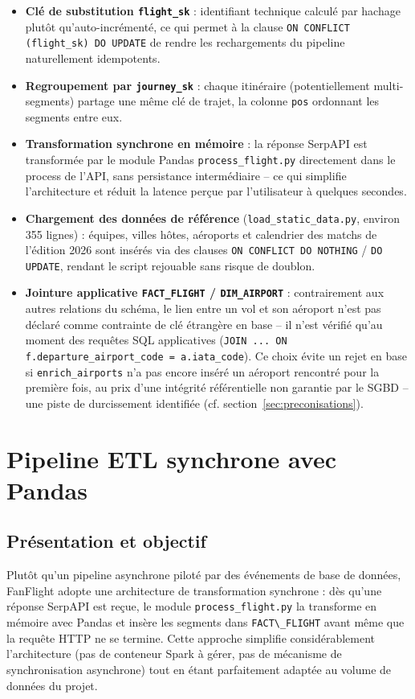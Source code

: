 \documentclass[11pt,a4paper]{report}
\newcommand{\code}[1]{\lstinline{#1}}
\begin{document}
\begin{itemize}
  \item \textbf{Clé de substitution \code{flight_sk}} : identifiant technique calculé par hachage plutôt qu'auto-incrémenté, ce qui permet à la clause \code{ON CONFLICT (flight_sk) DO UPDATE} de rendre les rechargements du pipeline naturellement idempotents.
  \item \textbf{Regroupement par \code{journey_sk}} : chaque itinéraire (potentiellement multi-segments) partage une même clé de trajet, la colonne \code{pos} ordonnant les segments entre eux.
  \item \textbf{Transformation synchrone en mémoire} : la réponse SerpAPI est transformée par le module Pandas \code{process_flight.py} directement dans le process de l'API, sans persistance intermédiaire -- ce qui simplifie l'architecture et réduit la latence perçue par l'utilisateur à quelques secondes.
  \item \textbf{Chargement des données de référence} (\code{load_static_data.py}, environ 355 lignes) : équipes, villes hôtes, aéroports et calendrier des matchs de l'édition 2026 sont insérés via des clauses \code{ON CONFLICT DO NOTHING} / \code{DO UPDATE}, rendant le script rejouable sans risque de doublon.
  \item \textbf{Jointure applicative \code{FACT_FLIGHT} / \code{DIM_AIRPORT}} : contrairement aux autres relations du schéma, le lien entre un vol et son aéroport n'est pas déclaré comme contrainte de clé étrangère en base -- il n'est vérifié qu'au moment des requêtes SQL applicatives (\code{JOIN ... ON f.departure_airport_code = a.iata_code}). Ce choix évite un rejet en base si \code{enrich_airports} n'a pas encore inséré un aéroport rencontré pour la première fois, au prix d'une intégrité référentielle non garantie par le SGBD -- une piste de durcissement identifiée (cf. section~\ref{sec:preconisations}).
\end{itemize}

\section{Pipeline ETL synchrone avec Pandas}

\subsection{Présentation et objectif}

Plutôt qu'un pipeline asynchrone piloté par des événements de base de données, FanFlight adopte une architecture de transformation synchrone : dès qu'une réponse SerpAPI est reçue, le module \code{process_flight.py} la transforme en mémoire avec Pandas et insère les segments dans \code{FACT\_FLIGHT} avant même que la requête HTTP ne se termine. Cette approche simplifie considérablement l'architecture (pas de conteneur Spark à gérer, pas de mécanisme de synchronisation asynchrone) tout en étant parfaitement adaptée au volume de données du projet.
\end{document}
